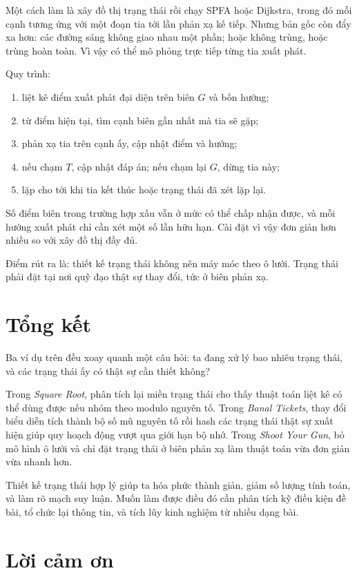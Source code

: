 \documentclass[11pt]{article}
\begin{document}
Một cách làm là xây đồ thị trạng thái rồi chạy SPFA hoặc Dijkstra, trong đó
mỗi cạnh tương ứng với một đoạn tia tới lần phản xạ kế tiếp. Nhưng bản gốc còn
đẩy xa hơn: các đường sáng không giao nhau một phần; hoặc không trùng, hoặc
trùng hoàn toàn. Vì vậy có thể mô phỏng trực tiếp từng tia xuất phát.

Quy trình:
\begin{enumerate}
  \item liệt kê điểm xuất phát đại diện trên biên \(G\) và bốn hướng;
  \item từ điểm hiện tại, tìm cạnh biên gần nhất mà tia sẽ gặp;
  \item phản xạ tia trên cạnh ấy, cập nhật điểm và hướng;
  \item nếu chạm \(T\), cập nhật đáp án; nếu chạm lại \(G\), dừng tia này;
  \item lặp cho tới khi tia kết thúc hoặc trạng thái đã xét lặp lại.
\end{enumerate}

Số điểm biên trong trường hợp xấu vẫn ở mức có thể chấp nhận được, và mỗi
hướng xuất phát chỉ cần xét một số lần hữu hạn. Cài đặt vì vậy đơn giản hơn
nhiều so với xây đồ thị đầy đủ.

Điểm rút ra là: thiết kế trạng thái không nên máy móc theo ô lưới. Trạng thái
phải đặt tại nơi quỹ đạo thật sự thay đổi, tức ở biên phản xạ.

\section{Tổng kết}

Ba ví dụ trên đều xoay quanh một câu hỏi: ta đang xử lý bao nhiêu trạng thái,
và các trạng thái ấy có thật sự cần thiết không?

Trong \textit{Square Root}, phân tích lại miền trạng thái cho thấy thuật toán
liệt kê có thể dùng được nếu nhóm theo modulo nguyên tố. Trong
\textit{Banal Tickets}, thay đổi biểu diễn tích thành bộ số mũ nguyên tố rồi
hash các trạng thái thật sự xuất hiện giúp quy hoạch động vượt qua giới hạn bộ
nhớ. Trong \textit{Shoot Your Gun}, bỏ mô hình ô lưới và chỉ đặt trạng thái ở
biên phản xạ làm thuật toán vừa đơn giản vừa nhanh hơn.

Thiết kế trạng thái hợp lý giúp ta hóa phức thành giản, giảm số lượng tính
toán, và làm rõ mạch suy luận. Muốn làm được điều đó cần phân tích kỹ điều
kiện đề bài, tổ chức lại thông tin, và tích lũy kinh nghiệm từ nhiều dạng bài.

\section*{Lời cảm ơn}
\end{document}
